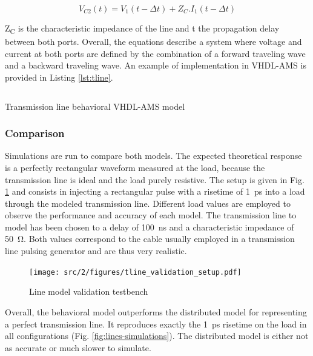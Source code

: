 \begin{equation}
V_{C2}(t) = V_{1}(t - \Delta t) + Z_{C}.I_{1}(t - \Delta t)
\label{eq:beh-line-2}
\end{equation}

Z\textsubscript{C} is the characteristic impedance of the line and \textDelta{}t the propagation delay between both ports.
Overall, the equations describe a system where voltage and current at both ports are defined by the combination of a forward traveling wave and a backward traveling wave.
An example of implementation in VHDL-AMS is provided in Listing \ref{lst:tline}.

\begin{code}
\inputminted[frame=single]{VHDL}{src/2/snippets/tline.vhdl}
\caption{Transmission line behavioral VHDL-AMS model}
\label{lst:tline}
\end{code}

\subsubsection{Comparison}

Simulations are run to compare both models.
The expected theoretical response is a perfectly rectangular waveform measured at the load, because the transmission line is ideal and the load purely resistive.
The setup is given in Fig. \ref{fig:lines-testbench} and consists in injecting a rectangular pulse with a risetime of \SI{1}{\pico\second} into a load through the modeled transmission line.
Different load values are employed to observe the performance and accuracy of each model.
The transmission line to model has been chosen to a delay of \SI{100}{\nano\second} and a characteristic impedance of \SI{50}{\ohm}.
Both values correspond to the cable usually employed in a transmission line pulsing generator and are thus very realistic.

\begin{figure}[!h]
  \centering
  \texttt{[image: src/2/figures/tline\_validation\_setup.pdf]}
  \caption{Line model validation testbench}
  \label{fig:lines-testbench}
\end{figure}

Overall, the behavioral model outperforms the distributed model for representing a perfect transmission line.
It reproduces exactly the \SI{1}{\pico\second} risetime on the load in all configurations (Fig. \ref{fig:lines-simulations}).
The distributed model is either not as accurate or much slower to simulate.


